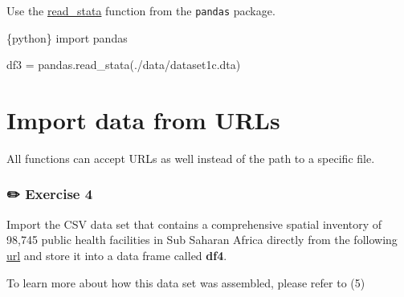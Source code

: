 \documentclass[
  letterpaper,
  DIV=11,
  numbers=noendperiod,
  oneside]{scrreprt}
\newenvironment{Shaded}{\begin{snugshade}}{\end{snugshade}}
\newcommand{\ImportTok}[1]{\textcolor[rgb]{0.00,0.46,0.62}{#1}}
\newcommand{\InformationTok}[1]{\textcolor[rgb]{0.37,0.37,0.37}{#1}}
\newcommand{\NormalTok}[1]{\textcolor[rgb]{0.00,0.23,0.31}{#1}}
\newcommand{\OperatorTok}[1]{\textcolor[rgb]{0.37,0.37,0.37}{#1}}
\newcommand{\StringTok}[1]{\textcolor[rgb]{0.13,0.47,0.30}{#1}}
\begin{document}
Use the
\href{https://pandas.pydata.org/docs/reference/api/pandas.read_stata.html}{read\_stata}
function from the \texttt{pandas} package.

\begin{Shaded}
\begin{Highlighting}[]
\InformationTok{\textasciigrave{}\textasciigrave{}\textasciigrave{}\{python\}}
\ImportTok{import}\NormalTok{ pandas}

\NormalTok{df3 }\OperatorTok{=}\NormalTok{ pandas.read\_stata(}\StringTok{\textquotesingle{}./data/dataset1c.dta\textquotesingle{}}\NormalTok{)}
\InformationTok{\textasciigrave{}\textasciigrave{}\textasciigrave{}}
\end{Highlighting}
\end{Shaded}

\hypertarget{import-data-from-urls}{%
\section{Import data from URLs}\label{import-data-from-urls}}

All functions can accept URLs as well instead of the path to a specific
file.

\subsubsection{\texorpdfstring{{✏️} Exercise 4}{✏️ Exercise 4}}

Import the CSV data set that contains a comprehensive spatial inventory
of 98,745 public health facilities in Sub Saharan Africa directly from
the following
\href{https://open.africa/dataset/d7335980-29d5-476c-bf7a-feb4e22cf631/resource/e2432e8a-cf15-4a8b-b8c3-567f443c1459/download/cfa-data-hospitals-in-africa-00-ssa-mfl-130219.xlsx-ssa-mfl.csv}{url}
and store it into a data frame called \textbf{df4}.

To learn more about how this data set was assembled, please refer to (5)
\end{document}
